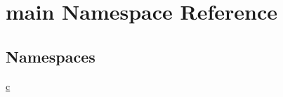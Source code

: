 \hypertarget{namespacemain}{}\section{main Namespace Reference}
\label{namespacemain}
\subsection*{Namespaces}
\begin{DoxyCompactItemize}
\item 
 \hyperlink{namespacemain_1_1c}{c}
\end{DoxyCompactItemize}
